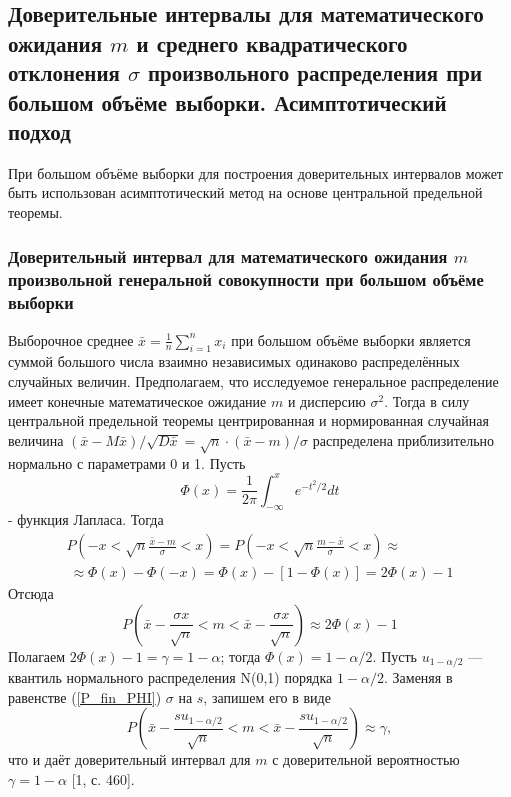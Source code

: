 \subsection{Доверительные интервалы для математического ожидания $m$ и среднего квадратического отклонения $\sigma$ произвольного распределения при большом объёме выборки. Асимптотический подход}
При большом объёме выборки для построения доверительных интервалов может быть использован асимптотический метод на основе центральной предельной теоремы.
\subsubsection{Доверительный интервал для математического ожидания $m$ произвольной генеральной совокупности при большом объёме выборки}
Выборочное среднее $\bar{x} = \frac{1}{n}\sum_{i = 1}^{n}{x_{i}}$ при большом объёме выборки является суммой большого числа взаимно независимых одинаково распределённых случайных величин. Предполагаем, что исследуемое генеральное распределение имеет конечные математическое ожидание $m$ и дисперсию $\sigma^{2}$. Тогда в силу центральной предельной теоремы центрированная и нормированная случайная величина $(\bar{x} - M\bar{x}) / \sqrt{D\bar{x}} = \sqrt{n}·(\bar{x}-m)/\sigma$ распределена приблизительно нормально с параметрами 0 и 1. Пусть
\begin{equation}
\Phi(x) = \frac{1}{2\pi}\int_{-\infty}^{x}{e^{-t^{2}/2}dt}
\label{f_lapl}
\end{equation}
- функция Лапласа. Тогда
\begin{multline}
P\left(-x < \sqrt{n}\frac{\bar{x} - m}{\sigma} < x \right) = 
P\left(-x < \sqrt{n}\frac{m - \bar{x}}{\sigma} < x \right) \approx \\\
\approx \Phi(x) - \Phi(-x)=\Phi(x) - [1 - \Phi(x)] = 2\Phi(x) - 1
\label{P_PHI}
\end{multline}
Отсюда
\begin{equation}
P\left(\bar{x} - \frac{\sigma x}{\sqrt{n}} < m < \bar{x} - \frac{\sigma x}{\sqrt{n}} \right) \approx 2\Phi(x) - 1
\label{P_fin_PHI}
\end{equation}
Полагаем $2\Phi(x) - 1 = \gamma = 1 - \alpha$; тогда $\Phi(x) = 1 - \alpha/2$. Пусть $u_{1-\alpha/2}$ — квантиль нормального распределения N(0,1) порядка $1-\alpha/2$. Заменяя в равенстве (\ref{P_fin_PHI}) $\sigma$ на $s$, запишем его в виде
\begin{equation}
P\left(\bar{x} - \frac{su_{1-\alpha/2}}{\sqrt{n}} < m < \bar{x} - \frac{su_{1-\alpha/2}}{\sqrt{n}} \right) \approx \gamma,
\label{P_fin_u}
\end{equation}
что и даёт доверительный интервал для $m$ с доверительной вероятностью $\gamma = 1-\alpha$ [1, с. 460].

